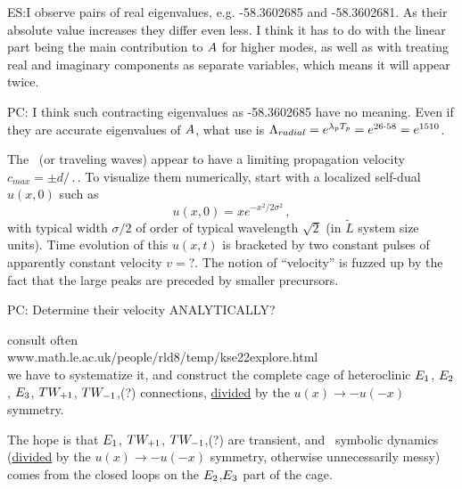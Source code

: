 ES:{I observe pairs of real eigenvalues,
e.g. -58.3602685 and -58.3602681. As their absolute
value increases they differ even less.
I think it has to do with the linear part being the main
contribution to $A$ for higher modes, as well as
with treating real and imaginary components
as separate variables, which means it will appear twice.
        }

PC: {I think such contracting eigenvalues as -58.3602685 have no meaning.
Even if they are accurate eigenvalues of $A$,
what use is
$\Lambda_{radial} =  e^{\lambda_p {T_{p}}} = e^{26\cdot58} = e^{1510}$.
        }

The \reqva\ (or traveling waves) appear to have a limiting propagation
velocity $c_{max} = \pm d/\period{}$.
To visualize them numerically,
start with a localized self-dual $u(x,0)$ such as
\[
u(x,0) = x e^{- x^2/2\sigma^2}
\,,
\]
with typical width $\sigma/2$ of order of typical wavelength
$\sqrt{2}$ (in $\tilde{L}$ system size units).
Time evolution of this  $u(x,t)$ is bracketed by two constant
pulses of apparently constant velocity $v=?$.
The notion of ``velocity''
is fuzzed up by the fact that the large peaks are preceded
by smaller precursors.

PC: {Determine their velocity ANALYTICALLY?}

consult often
\\
        www.math.le.ac.uk/people/rld8/temp/kse22explore.html
\\
we have to systematize it, and
construct the complete cage of heteroclinic $E_{1}$, $E_{2}$, $E_{3}$,
$TW_{+1}$,
$TW_{-1}$,(?)
connections, \underline{divided} by the $u(x) \to - u(-x)$ symmetry.

The hope is that $E_{1}$,
$TW_{+1}$,
$TW_{-1}$,(?) are transient, and \rpo\ symbolic
dynamics (\underline{divided} by the $u(x) \to - u(-x)$ symmetry, otherwise
unnecessarily messy) comes from the closed loops on
the $E_{2}$,$E_{3}$ part of the cage.



